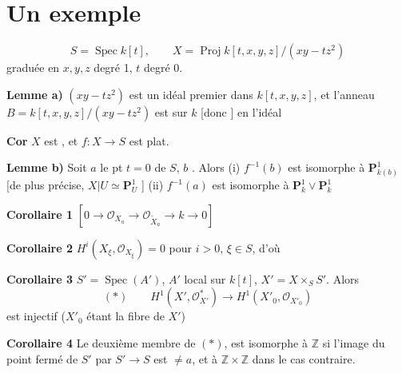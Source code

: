 \documentclass[11pt,a4paper]{article}
\begin{document}
\section{Un exemple}

\[
  S = \operatorname{Spec} k[t], \qquad X = \operatorname{Proj} k[t, x, y, z]/(xy - tz^2)
\]
\quad graduée en $x, y, z$ degré 1, $t$ degré 0.

\textbf{Lemme a)} \quad $(xy - tz^2)$ est un idéal premier dans $k[t, x, y, z]$, et l'anneau $B = k[t, x, y, z]/(xy - tz^2)$ est   sur $k$ [donc ]  \struck{\ill{}} en l'idéal  \ill{}

\textbf{Cor} \quad $X$ est \struck{\ill{}} , et $f : X \to S$ est plat.

\textbf{Lemme b)} \quad Soit $a$ le pt $t = 0$ de $S$, $b$   . Alors (i) $f^{-1}(b)$ est isomorphe à $\mathbf{P}^1_{k(b)}$ [de  plus précise, $X|U \simeq \mathbf{P}^1_U$  ]
(ii) $f^{-1}(a)$ est isomorphe \struck{\ill{}} à $\mathbf{P}^1_k \vee \mathbf{P}^1_k$

\textbf{Corollaire 1} \quad {} $\left[0 \to \mathcal{O}_{X_a} \to \mathcal{O}_{\widetilde{X}_a} \to k \to 0\right]$

\textbf{Corollaire 2} \quad $H^i(X_\xi, \mathcal{O}_{X_\xi}) = 0$ pour $i > 0$, $\xi \in S$, d'où \ill{}

\textbf{Corollaire 3} \quad {}   $S' = \operatorname{Spec}(A')$, $A'$ \ill{} local  sur $k[t]$, $X' = X \times_S S'$. Alors
\[
  (*) \qquad H^1(X', \mathcal{O}^*_{X'}) \to H^1(X'_0, \mathcal{O}_{X'_0})
\]
est injectif ($X'_0$ étant la fibre  de $X'$)   


\textbf{Corollaire 4} \quad Le deuxième membre de $(*)$, est \struck{\ill{}} isomorphe à $\mathbb{Z}$ si \struck{\ill{}} l'image du point fermé de $S'$ par $S' \to S$ est \struck{\ill{}} $\neq a$, et à $\mathbb{Z} \times \mathbb{Z}$ dans le cas contraire.
\end{document}
